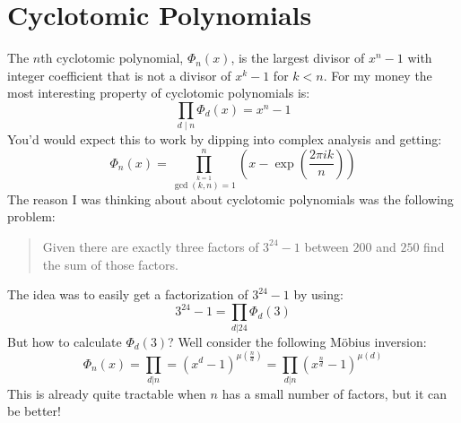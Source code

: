 
\section{Cyclotomic Polynomials}
The $n$th cyclotomic polynomial, $\Phi_n(x)$, is the largest divisor of $x^n-1$ with integer coefficient that is not a divisor of $x^k-1$ for $k<n$.
For my money the most interesting property of cyclotomic polynomials is:
\[\prod_{d\mid n} \Phi_d(x) = x^n-1\]
You'd would expect this to work by dipping into complex analysis and getting:
\[\Phi_n(x) = \prod_{\overset{k=1}{\gcd(k,n)=1}}^n\left(x-\exp\left(\frac{2\pi ik}{n}\right)\right)\]
The reason I was thinking about about cyclotomic polynomials was the following problem:
\begin{quote}
Given there are exactly three factors of $3^{24}-1$ between $200$ and $250$ find the sum of those factors.
\end{quote}
The idea was to easily get a factorization of $3^{24}-1$ by using:
\[3^{24}-1 = \prod_{d|24}\Phi_d(3)\]
But how to calculate $\Phi_d(3)$? 
Well consider the following Möbius inversion:
\[\Phi_n(x) = \prod_{d|n} = (x^d-1)^{\mu\left(\frac{n}{d}\right)} = \prod_{d|n} (x^\frac{n}{d}-1)^{\mu(d)}\]
This is already quite tractable when $n$ has a small number of factors,
but it can be better!
\\


